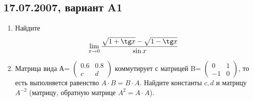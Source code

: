 \documentclass[pdftex,12pt,a4paper]{article}
\begin{document}
\subsection{17.07.2007, вариант A1}
\begin{enumerate}
\item Найдите 
\begin{equation}
\lim_{x\to 0}\frac{\sqrt{1+\tg x}-\sqrt{1-\tg x}}{\sin x}
\end{equation}
\item Матрица вида А=
$\left( \begin{array}{cc}
0.6 & 0.8\\
c & d
\end{array} \right)$ 
коммутирует с матрицей B=
$\left( \begin{array}{cc}
0 & 1\\
-1 & 0
\end{array} \right)$, то есть выполняется равенство $A\cdot B=B\cdot A$. Найдите константы $c,d$ и матрицу $A^{-2}$ (матрицу, обратную матрице $A^2=A\cdot A$).\\


\end{enumerate}
\end{document}
